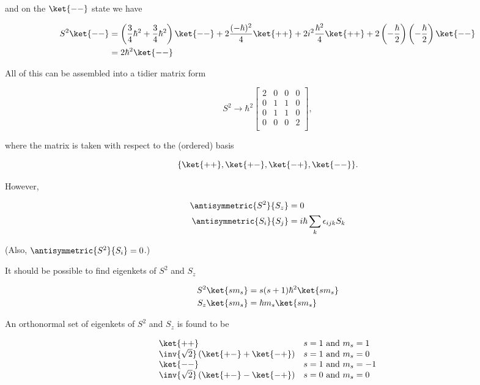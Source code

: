 and on the $\ket{--}$ state we have

\begin{align*}
S^2 \ket{--} 
&=
\left(\frac{3}{4}\hbar^2 +\frac{3}{4}\hbar^2\right)
\ket{--} 
+ 2 \frac{(-\hbar)^2}{4} 
\ket{++} 
+ 2 i^2 \frac{\hbar^2}{4} \ket{++} 
+2 
\left(-\frac{\hbar}{2}\right)
\left(-\frac{\hbar}{2}\right)
\ket{--} \\
&=
2 \hbar^2 \ket{--} 
\end{align*}

All of this can be assembled into a tidier matrix form

\begin{equation}\label{eqn:qmTwoL16:450}
S^2
\rightarrow 
\hbar^2
\begin{bmatrix}
2 & 0 & 0 & 0 \\
0 & 1 & 1 & 0 \\
0 & 1 & 1 & 0 \\
0 & 0 & 0 & 2 \\
\end{bmatrix},
\end{equation}

where the matrix is taken with respect to the (ordered) basis

\begin{equation}\label{eqn:qmTwoL16:470}
\{
\ket{++},
\ket{+-},
\ket{-+},
\ket{--}
\}.
\end{equation}

However, 

\begin{align}\label{eqn:qmTwoL16:490}
\antisymmetric{S^2}{S_z} &= 0 \\
\antisymmetric{S_i}{S_j} &= i \hbar \sum_k \epsilon_{ijk} S_k
\end{align}

(Also, $\antisymmetric{S^2}{S_i} = 0$.)

It should be possible to find eigenkets of $S^2$ and $S_z$

\begin{align}\label{eqn:qmTwoL16:510}
S^2 \ket{s m_s} &= s(s+1)\hbar^2 \ket{s m_s} \\
S_z \ket{s m_s} &= \hbar m_s \ket{s m_s} 
\end{align}

An orthonormal set of eigenkets of $S^2$ and $S_z$ is found to be

\begin{equation}\label{eqn:qmTwoL16:530}
\begin{array}{l l}
\ket{++} 
& \mbox{$s = 1$ and $m_s = 1$} \\
\inv{\sqrt{2}} \left( \ket{+-} + \ket{-+} \right) 
& \mbox{$s = 1$ and $m_s = 0$} \\
\ket{--} 
& \mbox{$s = 1$ and $m_s = -1$} \\
\inv{\sqrt{2}} \left( \ket{+-} - \ket{-+} \right) 
& \mbox{$s = 0$ and $m_s = 0$}
\end{array}
\end{equation}

